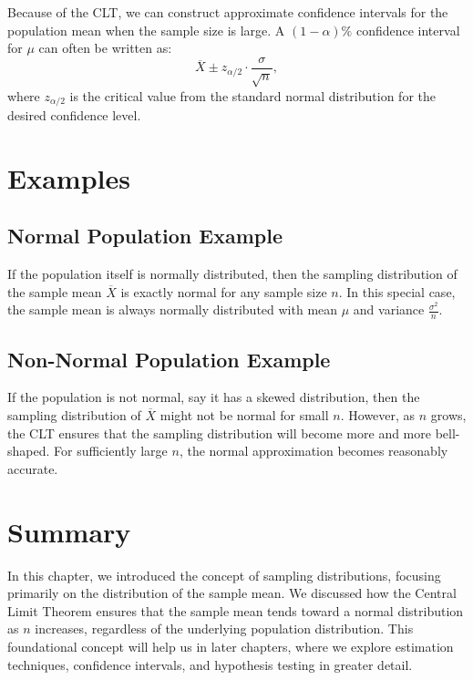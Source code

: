 Because of the CLT, we can construct approximate confidence intervals for the population mean when the sample size is large. A $(1-\alpha)\%$ confidence interval for $\mu$ can often be written as:
\[
\overline{X} \pm z_{\alpha/2} \cdot \frac{\sigma}{\sqrt{n}},
\]
where $z_{\alpha/2}$ is the critical value from the standard normal distribution for the desired confidence level.

\section{Examples}

\subsection{Normal Population Example}

If the population itself is normally distributed, then the sampling distribution of the sample mean $\overline{X}$ is exactly normal for any sample size $n$. In this special case, the sample mean is always normally distributed with mean $\mu$ and variance $\frac{\sigma^2}{n}$.

\subsection{Non-Normal Population Example}

If the population is not normal, say it has a skewed distribution, then the sampling distribution of $\overline{X}$ might not be normal for small $n$. However, as $n$ grows, the CLT ensures that the sampling distribution will become more and more bell-shaped. For sufficiently large $n$, the normal approximation becomes reasonably accurate.

\section{Summary}

In this chapter, we introduced the concept of sampling distributions, focusing primarily on the distribution of the sample mean. We discussed how the Central Limit Theorem ensures that the sample mean tends toward a normal distribution as $n$ increases, regardless of the underlying population distribution. This foundational concept will help us in later chapters, where we explore estimation techniques, confidence intervals, and hypothesis testing in greater detail.
